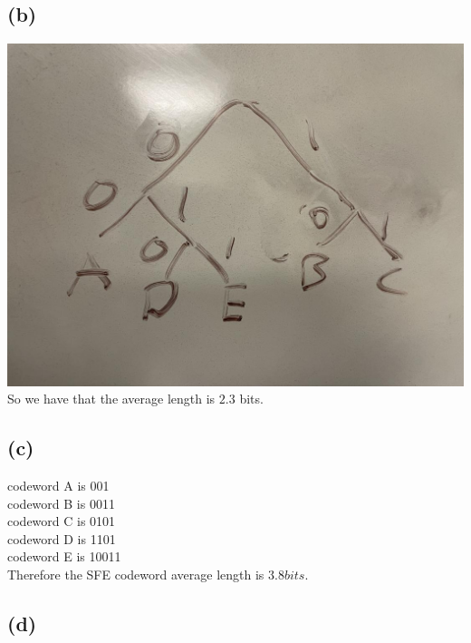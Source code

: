 \subsection*{(b)}
\includegraphics[scale=0.25]{fig1.jpg}\\
So we have that the average length is $\boxed{2.3}$ bits.
\subsection*{(c)}
codeword A is 001\\
codeword B is 0011\\
codeword C is 0101\\
codeword D is 1101\\
codeword E is 10011\\
Therefore the SFE codeword average length is $\boxed{3.8} bits$.
\subsection*{(d)}

